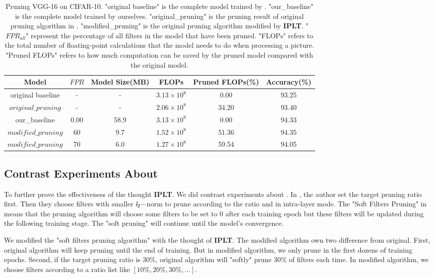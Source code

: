 \documentclass[runningheads]{llncs}
\begin{document}
\begin{table}[htbp]
 \caption{Pruning VGG-16 on CIFAR-10. "original baseline" is the complete model trained by \cite{b35}. "our\_baseline" is the complete model trained by ourselves. "original\_pruning" is the pruning result of original pruning algorithm in \cite{b35}. "modified\_pruning" is the original pruning algorithm modified by \textbf{IPLT}. "$FPR_{all}$" represent the percentage of all filters in the model that have been pruned. "FLOPs" refers to the total number of floating-point calculations that the model needs to do when processing a picture. "Pruned FLOPs" refers to how much computation can be saved by the pruned model compared with the original model.}
 \begin{tabular}{cccccc}
  \toprule
  Model&$FPR$&Model Size(MB)&FLOPs&Pruned FLOPs(\%)&Accuracy(\%)\\
  \midrule
  \hline
  original baseline&-&-&$3.13 \times 10^8$&0.00&93.25\\
  \hline
  $original\_pruning$&-&-&$2.06 \times 10^8$&34.20&93.40\\
  \hline
  our\_baseline&0.00&58.9&$3.13 \times 10^8$&0.00&94.33\\
  \hline
  \textbf{$modified\_pruning$}&60&9.7&$1.52 \times 10^8$&51.36&94.35\\
  \textbf{$modified\_pruning$}&70&6.0&$1.27 \times 10^8$&59.54&94.05\\
  \bottomrule
 \end{tabular}
\label{analysis1}
\end{table}


\subsection{Contrast Experiments About \cite{b27}}
To further prove the effectiveness of the thought \textbf{IPLT}. We did contrast experiments about \cite{b27}. In \cite{b27}, the author set the target pruning ratio first. Then they choose filters with smaller $\emph{l}_2-$norm to prune according to the ratio and in intra-layer mode. The "Soft Filters Pruning" in \cite{b27} means that the pruning algorithm will choose some filters to be set to 0 after each training epoch but these filters will be updated during the following training stage. The "soft pruning" will continue until the model's convergence.

We modified the "soft filters pruning algorithm" \cite{b27} with the thought of \textbf{IPLT}. The modified algorithm own two difference from original. First, original algorithm will keep pruning until the end of training. But in modified algorithm, we only prune in the first dozens of training epochs. Second, if the target pruning ratio is 30\%, original algorithm will "softly" prune 30\% of filters each time. In modified algorithm, we choose filters according to a ratio list like $[10\%, 20\%, 30\%, \dots]$.
\end{document}
